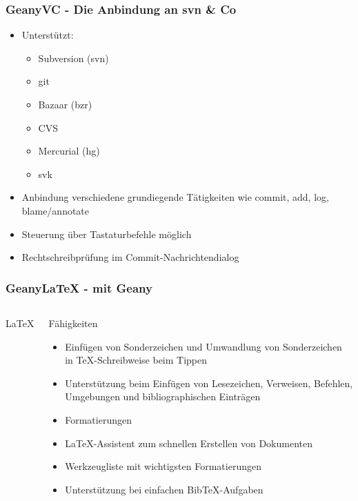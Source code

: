 \begin{frame}
  \frametitle{GeanyVC - Die Anbindung an svn \& Co}
  \begin{block}{}
    \begin{itemize}
    \item Unterstützt:
      \begin{itemize}
      \item Subversion (svn)
      \item git
      \item Bazaar (bzr)
      \item CVS
      \item Mercurial (hg)
      \item svk
      \end{itemize}
    \item Anbindung verschiedene grundiegende Tätigkeiten wie commit,
      add, log, blame/annotate
    \item Steuerung über Tastaturbefehle möglich
    \item Rechtschreibprüfung im Commit-Nachrichtendialog
    \end{itemize}
  \end{block}
\end{frame}

\begin{frame}
  \frametitle{Geany\LaTeX{} - \LaTeXe mit Geany}
  \begin{columns}[c]
    \column[c]{1.5cm} \huge \LaTeX
    \column{8.5cm} \normalsize
    \begin{block}{Fähigkeiten}
      \begin{itemize}
      \item Einfügen von Sonderzeichen und Umwandlung von
        Sonderzeichen in \TeX-Schreibweise beim Tippen
      \item Unterstützung beim Einfügen von Lesezeichen, Verweisen,
        Befehlen, Umgebungen und bibliographischen Einträgen
      \item Formatierungen
      \item \LaTeX-Assistent zum schnellen Erstellen von Dokumenten
      \item Werkzeugliste mit wichtigsten Formatierungen
      \item Unterstützung bei einfachen BibTeX-Aufgaben
      \end{itemize}
    \end{block}
  \end{columns}
\end{frame}

